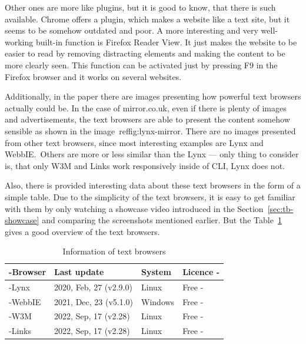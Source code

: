 Other ones are more like plugins, but it is good to know, that there
is such available. Chrome offers a plugin, which makes a website like a text
site, but it seems to be somehow outdated and poor. A more interesting
and very well-working built-in function is Firefox Reader View. It
just makes the website to be easier to read by removing distracting
elements and making the content to be more clearly seen. This function
can be activated just by pressing F9 in the Firefox browser and it
works on several websites.

Additionally, in the paper there are images presenting how powerful text browsers actually could
be. In the case of mirror.co.uk, even if there is plenty of images and
advertisements, the text browsers are able to present the content
somehow sensible as shown in the image~ref{fig:lynx-mirror}. 
There are no images presented from other text browsers, since most 
interesting examples are Lynx and
WebbIE.~Others are more or less similar than the Lynx --- only thing to
consider is, that only W3M and Links work responsively inside of CLI, Lynx
does not.

Also, there is provided interesting data about these text browsers 
in the form of a simple table. Due to the simplicity of the text
browsers, it is easy to get familiar with them by only watching a
showcase video introduced in the Section~\ref{sec:tb-showcase} and 
comparing the screenshots mentioned earlier. But the Table~\ref{tab:text-browsers-info} 
gives a good overview of the text browsers.


\begin{table}[htp]
\tablestretch%
\centering
\begin{tabularx}{\linewidth}
{>{\kern-\tabcolsep}llXX<{\kern-\tabcolsep}}
\toprule
\textbf{Browser} & \textbf{Last update} & \textbf{System} & \textbf{Licence} \\
\midrule
Lynx & 2020, Feb, 27 (v2.9.0) & Linux & Free \\
%
WebbIE & 2021, Dec, 23 (v5.1.0) & Windows & Free \\
%
W3M & 2022, Sep, 17 (v2.28) & Linux & Free \\
%
Links & 2022, Sep, 17 (v2.28) & Linux & Free \\
%
\bottomrule
\end{tabularx}

\caption[Text-Only Browser Information]
{
Information of text browsers
}%
\label{tab:text-browsers-info}
\end{table}


